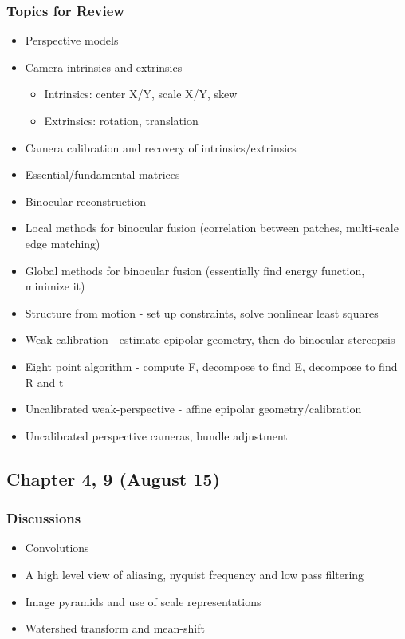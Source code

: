 \subsubsection*{Topics for Review}
\begin{itemize}
\item Perspective models
\item Camera intrinsics and extrinsics
  \begin{itemize}
    \item Intrinsics: center X/Y, scale X/Y, skew
    \item Extrinsics: rotation, translation
  \end{itemize}
\item Camera calibration and recovery of intrinsics/extrinsics
\item Essential/fundamental matrices
\item Binocular reconstruction
\item Local methods for binocular fusion (correlation between patches, multi-scale edge matching)
\item Global methods for binocular fusion (essentially find energy function, minimize it)
\item Structure from motion - set up constraints, solve nonlinear least squares
\item Weak calibration - estimate epipolar geometry, then do binocular stereopsis
\item Eight point algorithm - compute F, decompose to find E, decompose to find R and t
\item Uncalibrated weak-perspective - affine epipolar geometry/calibration
\item Uncalibrated perspective cameras, bundle adjustment
\end{itemize}


\subsection{Chapter 4, 9 (August 15)}

\subsubsection*{Discussions}
\begin{itemize}
\item Convolutions
\item A high level view of aliasing, nyquist frequency and low pass filtering
\item Image pyramids and use of scale representations
\item Watershed transform and mean-shift
\end{itemize}


